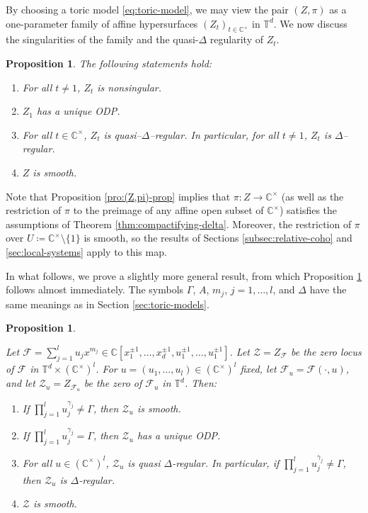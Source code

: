 \documentclass[11pt, reqno]{amsart}
\theoremstyle{plain}
\newtheorem{prop}[thm]{Proposition}
\theoremstyle{definition}
\newcommand{\CC}{\mathbb{C}}
\newcommand{\TT}{\mathbb{T}}
\begin{document}
By choosing a toric model \eqref{eq:toric-model}, we may view the pair $(Z, \pi)$ as a one-parameter family of affine hypersurfaces $(Z_t)_{t \in \CC^\times}$ in $\TT^d$. 
We now discuss the singularities of the family and the quasi-$\Delta$ regularity of $Z_t$.  

\begin{prop}
\label{pro:(Z,pi)-prop}
The following statements hold:
    \begin{enumerate}
    \item For all $t \neq 1$, $Z_t$ is nonsingular. 
    \item   $Z_1$ has a unique ODP. 
    \item  For all $t \in \CC^\times$, $Z_t$ is quasi--$\Delta$--regular. In particular, for all $t \neq 1$, $Z_t$ is $\Delta$--regular. 
    \item $Z$ is smooth. 
    \end{enumerate}
\end{prop} 

Note that Proposition \eqref{pro:(Z,pi)-prop} implies that $\pi \colon Z \to \CC^\times$ (as well as the restriction of $\pi$ to the preimage of any affine open subset of $\CC^\times$) satisfies the assumptions of Theorem \ref{thm:compactifying-delta}. Moreover, the restriction of $\pi$ over $U\coloneqq \CC^\times \setminus \{1\}$ is smooth, so the results of Sections \ref{subsec:relative-coho} and \ref{sec:local-systems} apply to this map. 
\smallskip

In what follows, we prove a slightly more general result, from which Proposition \ref{pro:(Z,pi)-prop} follows almost immediately. The symbols $\Gamma$, ${A}$,  $m_j$, $j=1, \dots, l$, and $\Delta$ have the same meanings as in Section \ref{sec:toric-models}.

\begin{prop}
\label{prop:u-result} 

Let $\mathcal{F}=\sum_{j=1}^l u_j x^{m_j} \in \CC[x_1^{\pm 1}, \dots, x_d^{\pm 1}, u_1^{\pm 1}, \dots, u_1^{\pm 1}]$. Let $\mathcal{Z}=Z_\mathcal{F}$ be the zero locus of $\mathcal{F}$ in $\TT^d \times (\CC^\times)^l$. 
For $u=(u_1, \dots, u_l) \in (\CC^\times)^l$ fixed, let $\mathcal{F}_u=\mathcal{F}(\cdot,u)$, and let $\mathcal{Z}_u=Z_{\mathcal{F}_u}$ be the zero of $\mathcal{F}_u$ in $\TT^d$. Then:   
    \begin{enumerate}
    \item  If $\prod_{j=1}^l u_j^{\gamma_j} \neq \Gamma$, then $\mathcal{Z}_u$ is smooth. 
    \item  If $\prod_{j=1}^l u_j^{\gamma_j} = \Gamma$, then $\mathcal{Z}_u$ has a unique ODP.  
    \item  For all $u \in (\CC^\times)^l$, $\mathcal{Z}_u$ is quasi $\Delta$-regular. In particular, if $\prod_{j=1}^l u_j^{\gamma_j} \neq \Gamma$, then $\mathcal{Z}_u$ is $\Delta$-regular. 
    \item $\mathcal{Z}$ is smooth.
    \end{enumerate}
\end{prop}
\end{document}
